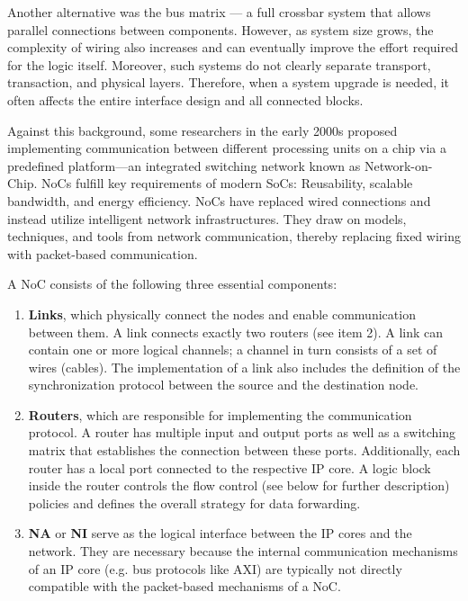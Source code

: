 Another alternative was the bus matrix — a full crossbar system that allows parallel connections between components. However, as system size grows, the complexity of wiring also increases and can eventually improve the effort required for the logic itself. Moreover, such systems do not clearly separate transport, transaction, and physical layers. Therefore, when a system upgrade is needed, it often affects the entire interface design and all connected blocks.


Against this background, some researchers in the early 2000s proposed implementing communication between different processing units on a chip via a predefined platform—an integrated switching network known as Network-on-Chip. NoCs fulfill key requirements of modern \ac{SoC}s: Reusability, scalable bandwidth, and energy efficiency. NoCs have replaced wired connections and instead utilize intelligent network infrastructures. They draw on models, techniques, and tools from network communication, thereby replacing fixed wiring with packet-based communication.\cite{unnikrishnan_network_2021}


A \ac{NoC} consists of the following three essential components:\cite{yu_flexible_2010}\cite{unnikrishnan_network_2021}


\begin{enumerate}
    \item \textbf{Links}, which physically connect the nodes and enable communication between them. A link connects exactly two routers (see item 2). A link can contain one or more logical channels; a channel in turn consists of a set of wires (cables). The implementation of a link also includes the definition of the synchronization protocol between the source and the destination node.
    \item \textbf{Routers}, which are responsible for implementing the communication protocol. A router has multiple input and output ports as well as a switching matrix that establishes the connection between these ports. Additionally, each router has a local port connected to the respective IP core. A logic block inside the router controls the flow control (see below for further description) policies and defines the overall strategy for data forwarding.
    \item \textbf{\ac{NA}} or \textbf{\ac{NI}} serve as the logical interface between the IP cores and the network. They are necessary because the internal communication mechanisms of an IP core (e.g. bus protocols like AXI) are typically not directly compatible with the packet-based mechanisms of a \ac{NoC}.
\end{enumerate}


